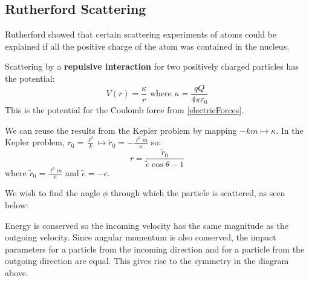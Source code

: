 \documentclass[../main.tex]{subfiles}
\begin{document}
\subsection{Rutherford Scattering}
Rutherford showed that certain scattering experiments of atoms could be explained if all the positive charge of the atom was contained in the nucleus.

Scattering by a \textbf{repulsive interaction} for two positively charged particles has the potential:
\[
  V(r) = \frac{\kappa}{r} \text{ where } \kappa = \frac{qQ}{4\pi\varepsilon_0}
\]
This is the potential for the Coulomb force from \cref{electricForces}.

We can reuse the results from the Kepler problem by mapping $-km \mapsto \kappa$.
In the Kepler problem, $r_0 = \frac{\ell^2}{k} \mapsto \widetilde{r}_0 = -\frac{\ell^2m}{\kappa}$ so:
\[
  r = \frac{\widetilde{r}_0}{\widetilde{e} \cos \theta - 1}
\]
where $\widetilde{r}_0 = \frac{\ell^2 m}{\kappa}$ and $\widetilde{e} = -e$.

We wish to find the angle $\phi$ through which the particle is scattered, as seen below:
\begin{center}
\end{center}
Energy is conserved so the incoming velocity has the same magnitude as the outgoing velocity.
Since angular momentum is also conserved, the impact parameters for a particle from the incoming direction and for a particle from the outgoing direction are equal.
This gives rise to the symmetry in the diagram above.
\end{document}
